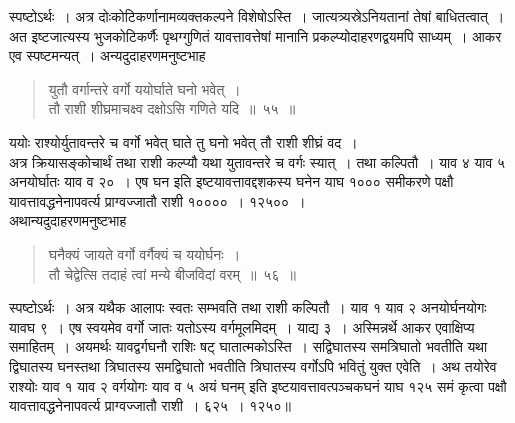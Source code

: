 \documentclass[11pt, openany]{book}
\begin{document}
स्पष्टोऽर्थः~। अत्र दोःकोटिकर्णानामव्यक्तकल्पने विशेषोऽस्ति~। जात्यत्र्यस्रेऽनियतानां तेषां बाधितत्वात्~। अत इष्टजात्यस्य भुजकोटिकर्णैः पृथग्गुणितं यावत्तावत्तेषां मानानि प्रकल्प्योदाहरणद्वयमपि साध्यम्~। आकर
एव स्पष्टमन्यत्~। अन्यदुदाहरणमनुष्टभाह\textendash
 \newpage%
 
\begin{quote}
    \ex
    युतौ वर्गान्तरे वर्गो ययोर्घाते घनो भवेत्~। \\
 तौ राशी शीघ्रमाचक्ष्व दक्षोऽसि गणिते यदि~॥~५५~॥~
\end{quote}
 
ययोः राश्योर्युतावन्तरे च वर्गो भवेत् घाते तु घनो भवेत् तौ राशी शीघ्रं वद~। \\

\vspace{-3mm}
 अत्र क्रियासङ्कोचार्थं तथा राशी कल्प्यौ यथा युतावन्तरे च वर्गः 
स्यात्~। तथा कल्पितौ~। याव ४ याव ५ अनयोर्घातः याव व २०~। 
एष घन इति इष्टयावत्तावद्दशकस्य घनेन याघ १००० समीकरणे पक्षौ 
यावत्तावद्धनेनापवर्त्य प्राग्वज्जातौ राशी १००००~। १२५००~। \\

\vspace{-3mm}
 अथान्यदुदाहरणमनुष्टभाह\textendash 
\begin{quote}
    \ex
     घनैक्यं जायते वर्गो वर्गैक्यं च ययोर्घनः~। \\
 तौ चेद्वेत्सि तदाहं त्वां मन्ये बीजविदां वरम्~॥~५६~॥
\end{quote}

स्पष्टोऽर्थः~। अत्र यथैक आलापः स्वतः सम्भवति तथा राशी कल्पितौ~। याव १ याव २ अनयोर्घनयोगः यावघ ९~। एष स्वयमेव वर्गो जातः 
यतोऽस्य वर्गमूलमिदम्~। याद्य ३~। अस्मिन्नर्थे आकर एवाक्षिप्य समाहितम्~। 
अयमर्थः यावद्वर्गघनौ राशिः षट् घातात्मकोऽस्ति~। सद्विघातस्य समत्रिघातो 
भवतीति यथा द्विघातस्य घनस्तथा त्रिघातस्य समद्विघातो भवतीति 
त्रिघातस्य वर्गोऽपि भवितुं युक्त एवेति~। अथ तयोरेव राश्योः याव १ 
याव २ वर्गयोगः याव व ५ अयं घनम् इति इष्टयावत्तावत्पञ्चकघनं 
याघ १२५ समं कृत्वा पक्षौ यावत्तावद्धनेनापवर्त्य प्राग्वज्जातौ राशी~। 
६२५~। १२५०॥ \\
\end{document}
